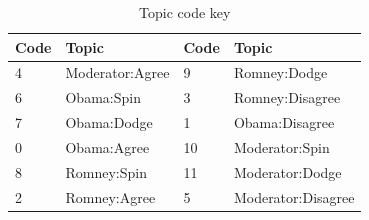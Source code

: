\begin{table}[H]
\begin{centering}
\begin{tabular}{ l | l | l | l }
 Code & Topic & Code & Topic \\
\hline
4 & Moderator:Agree & 9 & Romney:Dodge \\
6 & Obama:Spin & 3 & Romney:Disagree \\
7 & Obama:Dodge & 1 & Obama:Disagree \\
0 & Obama:Agree & 10 & Moderator:Spin \\
8 & Romney:Spin & 11 & Moderator:Dodge \\
2 & Romney:Agree & 5 & Moderator:Disagree \\

\end{tabular}
\caption{Topic code key}
\end{centering}
\end{table}
